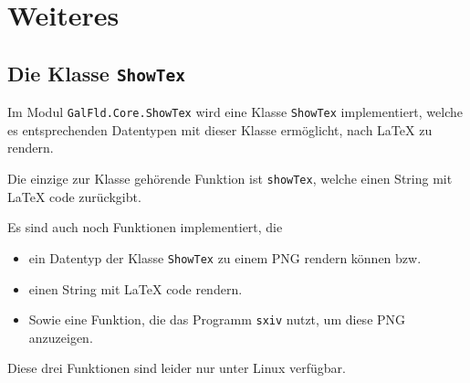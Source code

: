 \section{Weiteres}
\subsection{Die Klasse \texttt{ShowTex}}
Im Modul \texttt{GalFld.Core.ShowTex} wird eine Klasse \texttt{ShowTex}
implementiert, welche es entsprechenden Datentypen mit dieser Klasse
ermöglicht, nach \LaTeX{} zu rendern.

Die einzige zur Klasse gehörende Funktion ist \texttt{showTex}, welche einen
String mit \LaTeX{} code zurückgibt.

Es sind auch noch Funktionen implementiert, die 
\begin{itemize}
  \item ein Datentyp der Klasse \texttt{ShowTex} zu einem PNG rendern können
    bzw.
  \item einen String mit \LaTeX{} code rendern.
  \item Sowie eine Funktion, die das Programm \texttt{sxiv} nutzt, um diese PNG
    anzuzeigen.
\end{itemize}
Diese drei Funktionen sind leider nur unter Linux verfügbar.

